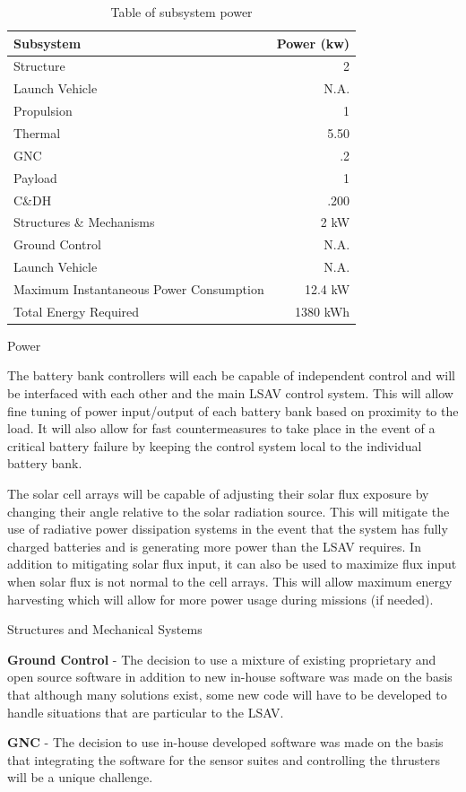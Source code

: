 \documentclass[10pt]{article}
\begin{document}
\begin{table}[H]
  \centering
  \caption{Table of subsystem power}
  \label{table:P}
  \begin{tabular}{p{2in}r} 
    Subsystem & Power (kw) \\ \hline
    Structure & 2 \\ 
    Launch Vehicle & N.A. \\
    Propulsion & 1 \\
    Thermal & 5.50 \\
    GNC & .2 \\
    Payload & 1 \\
    C\&DH & .200 \\
    Structures \& Mechanisms & 2 kW \\
    Ground Control & N.A. \\
    Launch Vehicle & N.A. \\ \hline
    Maximum Instantaneous Power Consumption & 12.4 kW \\ \hline
    Total Energy Required & 1380 kWh \\ 
  \end{tabular}
\end{table}


Power

The battery bank controllers will each be capable of independent
control and will be interfaced with each other and the main LSAV
control system. This will allow fine tuning of power input/output of
each battery bank based on proximity to the load. It will also allow
for fast countermeasures to take place in the event of a critical
battery failure by keeping the control system local to the individual
battery bank.

The solar cell arrays will be capable of adjusting their solar flux
exposure by changing their angle relative to the solar radiation
source. This will mitigate the use of radiative power dissipation
systems in the event that the system has fully charged batteries and
is generating more power than the LSAV requires. In addition to
mitigating solar flux input, it can also be used to maximize flux
input when solar flux is not normal to the cell arrays. This will
allow maximum energy harvesting which will allow for more power usage
during missions (if needed).

Structures and Mechanical Systems

\textbf{Ground Control} - The decision to use a mixture of existing
proprietary and open source software in addition to new in-house
software was made on the basis that although many solutions exist,
some new code will have to be developed to handle situations that are
particular to the LSAV.

\textbf{GNC} - The decision to use in-house developed software was
made on the basis that integrating the software for the sensor suites
and controlling the thrusters will be a unique challenge. 
\end{document}
